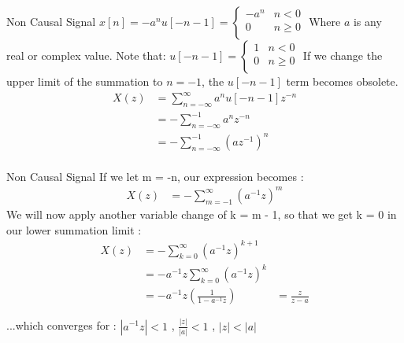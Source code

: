 \documentclass{beamer}
\begin{document}
\begin{frame}{Non Causal Signal}
    $ x[n] = -a^{n}u[-n-1] =  
        \begin{cases}
            -a^{n} & n < 0\\
            0 & n \geq 0\\
        \end{cases}
    $ 
    \linebreak
    Where $a$ is any real or complex value. \linebreak
    Note that: 
    $ u[-n-1] =  
        \begin{cases}
            1 & n < 0\\
            0 & n \geq 0\\
        \end{cases}
    $ 
    \linebreak
    If we change the upper limit of the summation to $n=-1$, the $u[-n-1]$ term becomes obsolete.
    \begin{align*}
    {X(z)} &= \sum_{n=-\infty}^{\infty} a^{n}u[-n-1]z^{-n} \\
           &= - \sum_{n=-\infty}^{-1} a^{n}z^{-n} \\
           &= - \sum_{n=-\infty}^{-1} (az^{-1})^{n} \\
    \end{align*}
    
\end{frame}
\begin{frame}{Non Causal Signal}
    If we let m = -n, our expression becomes : 
    \begin{align*}
    {X(z)} &= - \sum_{m=-1}^{\infty} (a^{-1} z)^{m}
    \end{align*}
    We will now apply another variable change of k = m - 1, so that we get k = 0 in our lower summation limit : 
    \begin{align*}
    {X(z)} &= - \sum_{k = 0}^{\infty} (a^{-1} z)^{k+1} \\
           &= - a^{-1} z \sum_{k = 0}^{\infty} (a^{-1} z)^{k} \\
           &= - a^{-1} z (\frac{1}{1 - a^{-1}z}) & \boxed{= \frac{z}{z-a}}
    \end{align*}
    
    ...which converges for : $|a^{-1}z| < 1$ , $\frac{|z|}{|a|} < 1$ , $|z| < |a|$
    
    
\end{frame}
\end{document}
